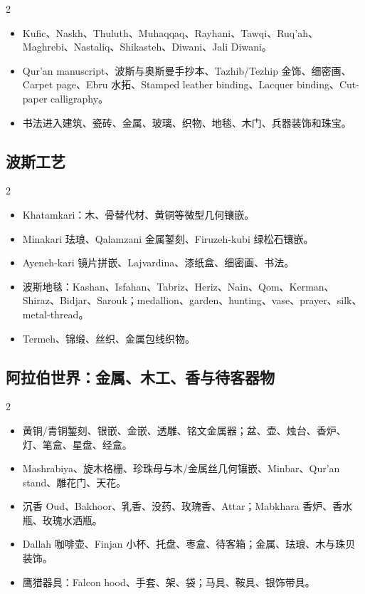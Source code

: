 \documentclass[lang=en,a4paper,11pt]{elegantpaper}
\begin{document}
\begin{multicols}{2}
\begin{itemize}
\item Kufic、Naskh、Thuluth、Muhaqqaq、Rayhani、Tawqi、Ruq'ah、Maghrebi、Nastaliq、Shikasteh、Diwani、Jali Diwani。
\item Qur'an manuscript、波斯与奥斯曼手抄本、Tazhib/Tezhip 金饰、细密画、Carpet page、Ebru 水拓、Stamped leather binding、Lacquer binding、Cut-paper calligraphy。
\item 书法进入建筑、瓷砖、金属、玻璃、织物、地毯、木门、兵器装饰和珠宝。
\end{itemize}
\end{multicols}

\subsection{波斯工艺}


\begin{multicols}{2}
\begin{itemize}
\item Khatamkari：木、骨替代材、黄铜等微型几何镶嵌。
\item Minakari 珐琅、Qalamzani 金属錾刻、Firuzeh-kubi 绿松石镶嵌。
\item Ayeneh-kari 镜片拼嵌、Lajvardina、漆纸盒、细密画、书法。
\item 波斯地毯：Kashan、Isfahan、Tabriz、Heriz、Nain、Qom、Kerman、Shiraz、Bidjar、Sarouk；medallion、garden、hunting、vase、prayer、silk、metal-thread。
\item Termeh、锦缎、丝织、金属包线织物。
\end{itemize}
\end{multicols}

\subsection{阿拉伯世界：金属、木工、香与待客器物}


\begin{multicols}{2}
\begin{itemize}
\item 黄铜/青铜錾刻、银嵌、金嵌、透雕、铭文金属器；盆、壶、烛台、香炉、灯、笔盒、星盘、经盒。
\item Mashrabiya、旋木格栅、珍珠母与木/金属丝几何镶嵌、Minbar、Qur'an stand、雕花门、天花。
\item 沉香 Oud、Bakhoor、乳香、没药、玫瑰香、Attar；Mabkhara 香炉、香水瓶、玫瑰水洒瓶。
\item Dallah 咖啡壶、Finjan 小杯、托盘、枣盒、待客箱；金属、珐琅、木与珠贝装饰。
\item 鹰猎器具：Falcon hood、手套、架、袋；马具、鞍具、银饰带具。
\end{itemize}
\end{multicols}
\end{document}
